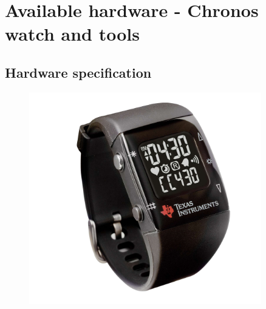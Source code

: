 \chapter{Available hardware - Chronos watch and tools}

\section{Hardware specification}

\begin{figure}[h!]
  \centering
  \includegraphics[width=0.9\textwidth]{img/chronos_watch.jpg}
  \caption{}
\end{figure}

